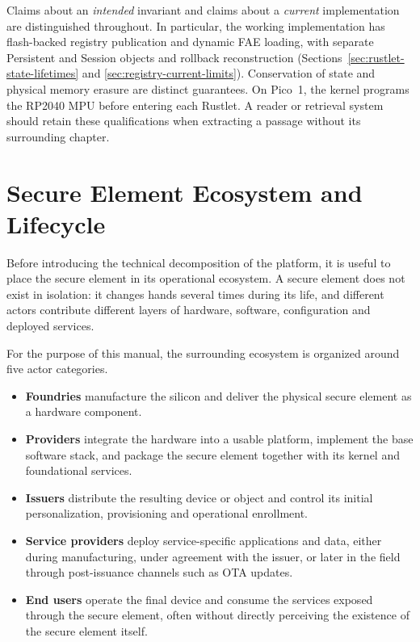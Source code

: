 Claims about an \emph{intended} invariant and claims about a \emph{current}
implementation are distinguished throughout. In particular, the working
implementation has flash-backed registry publication and dynamic FAE loading,
with separate Persistent and Session objects and rollback reconstruction
(Sections~\ref{sec:rustlet-state-lifetimes} and
\ref{sec:registry-current-limits}). Conservation of state and physical memory
erasure are distinct guarantees. On Pico~1, the kernel programs the RP2040 MPU before entering each Rustlet. A reader or retrieval
system should retain these qualifications when extracting a passage without
its surrounding chapter.

\section{Secure Element Ecosystem and Lifecycle}

Before introducing the technical decomposition of the platform, it is useful to
place the secure element in its operational ecosystem. A secure element does
not exist in isolation: it changes hands several times during its life, and
different actors contribute different layers of hardware, software,
configuration and deployed services.

For the purpose of this manual, the surrounding ecosystem is organized around
five actor categories.

\begin{itemize}
\item \textbf{Foundries} manufacture the silicon and deliver the physical secure
  element as a hardware component.
\item \textbf{Providers} integrate the hardware into a usable platform,
  implement the base software stack, and package the secure element together
  with its kernel and foundational services.
\item \textbf{Issuers} distribute the resulting device or object and control its
  initial personalization, provisioning and operational enrollment.
\item \textbf{Service providers} deploy service-specific applications and data,
  either during manufacturing, under agreement with the issuer, or later in the
  field through post-issuance channels such as OTA updates.
\item \textbf{End users} operate the final device and consume the services
  exposed through the secure element, often without directly perceiving the
  existence of the secure element itself.
\end{itemize}

